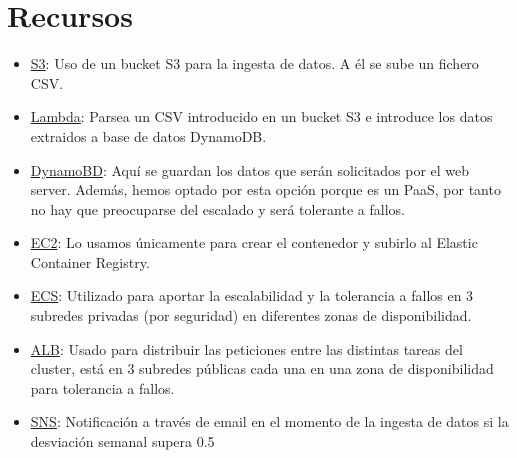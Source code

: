 \section{Recursos}
\begin{itemize}
    \item \underline{S3}: Uso de un bucket S3 para la ingesta de datos. A él se sube un fichero CSV.
    \item \underline{Lambda}: Parsea un CSV introducido en un bucket S3 e introduce los datos extraidos a base de datos DynamoDB.
    \item \underline{DynamoBD}: Aquí se guardan los datos que serán solicitados por el web server. Además, hemos optado por esta opción porque es un PaaS, por tanto no hay que preocuparse del escalado y será tolerante a fallos.
    \item \underline{EC2}: Lo usamos únicamente para crear el contenedor y subirlo al Elastic Container Registry.
    \item \underline{ECS}: Utilizado para aportar la escalabilidad y la tolerancia a fallos en 3 subredes privadas (por seguridad) en diferentes zonas de disponibilidad.
    \item \underline{ALB}: Usado para distribuir las peticiones entre las distintas tareas del cluster, está en 3 subredes públicas cada una en una zona de disponibilidad para tolerancia a fallos.
    \item \underline{SNS}: Notificación a través de email en el momento de la ingesta de datos si la desviación semanal supera 0.5
\end{itemize}